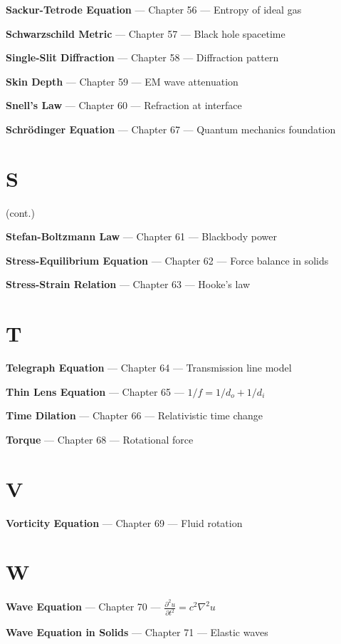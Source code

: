 \textbf{Sackur-Tetrode Equation} --- Chapter 56 --- Entropy of ideal gas

\textbf{Schwarzschild Metric} --- Chapter 57 --- Black hole spacetime

\textbf{Single-Slit Diffraction} --- Chapter 58 --- Diffraction pattern

\textbf{Skin Depth} --- Chapter 59 --- EM wave attenuation

\textbf{Snell's Law} --- Chapter 60 --- Refraction at interface

\textbf{Schrödinger Equation} --- Chapter 67 --- Quantum mechanics foundation

\section*{S} (cont.)

\textbf{Stefan-Boltzmann Law} --- Chapter 61 --- Blackbody power

\textbf{Stress-Equilibrium Equation} --- Chapter 62 --- Force balance in solids

\textbf{Stress-Strain Relation} --- Chapter 63 --- Hooke's law

\section*{T}

\textbf{Telegraph Equation} --- Chapter 64 --- Transmission line model

\textbf{Thin Lens Equation} --- Chapter 65 --- $1/f = 1/d_o + 1/d_i$

\textbf{Time Dilation} --- Chapter 66 --- Relativistic time change

\textbf{Torque} --- Chapter 68 --- Rotational force

\section*{V}

\textbf{Vorticity Equation} --- Chapter 69 --- Fluid rotation

\section*{W}

\textbf{Wave Equation} --- Chapter 70 --- $\frac{\partial^2 u}{\partial t^2} = c^2 \nabla^2 u$

\textbf{Wave Equation in Solids} --- Chapter 71 --- Elastic waves

